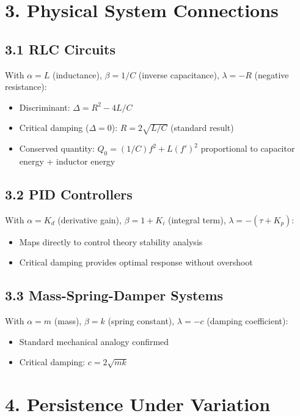 \documentclass[11pt]{article}
\begin{document}
\section{3. Physical System Connections}

\subsection{3.1 RLC Circuits}
With $\alpha = L$ (inductance), $\beta = 1/C$ (inverse capacitance), $\lambda = -R$ (negative resistance):
\begin{itemize}
\item Discriminant: $\Delta = R^2 - 4L/C$
\item Critical damping ($\Delta = 0$): $R = 2\sqrt{L/C}$ (standard result)
\item Conserved quantity: $Q_0 = (1/C)f^2 + L(f')^2$ proportional to capacitor energy + inductor energy
\end{itemize}

\subsection{3.2 PID Controllers}
With $\alpha = K_d$ (derivative gain), $\beta = 1+K_i$ (integral term), $\lambda = -(\tau+K_p)$:
\begin{itemize}
\item Maps directly to control theory stability analysis
\item Critical damping provides optimal response without overshoot
\end{itemize}

\subsection{3.3 Mass-Spring-Damper Systems}
With $\alpha = m$ (mass), $\beta = k$ (spring constant), $\lambda = -c$ (damping coefficient):
\begin{itemize}
\item Standard mechanical analogy confirmed
\item Critical damping: $c = 2\sqrt{mk}$
\end{itemize}

\section{4. Persistence Under Variation}
\end{document}
